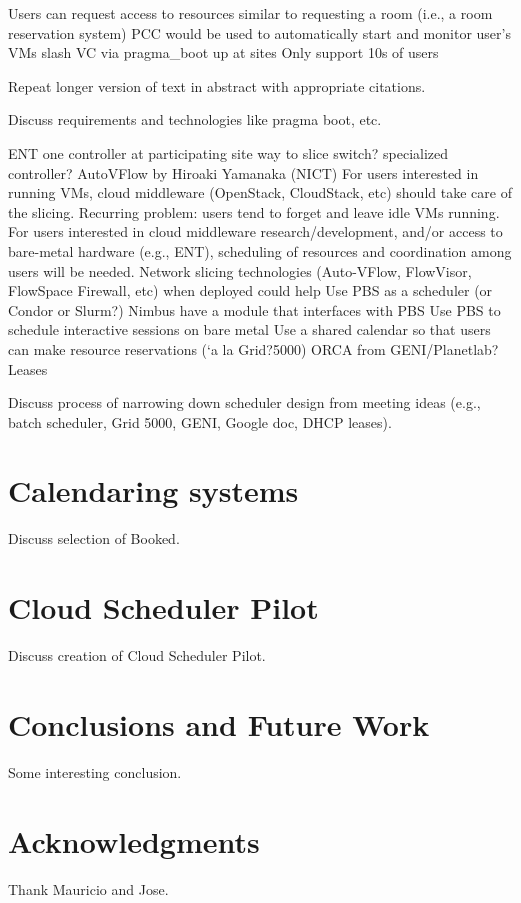 \documentclass{acm_proc_article-sp}
\begin{document}
Users can request access to resources similar to requesting a room (i.e., a room reservation system)
PCC would be used to automatically start and monitor user's VMs slash VC via pragma\_boot up at sites 
Only support 10s of users


Repeat longer version of text in abstract with appropriate citations.

Discuss requirements and technologies like pragma boot, etc.


ENT
one controller at participating site
way to slice switch? specialized controller? 
AutoVFlow by Hiroaki Yamanaka (NICT)
For users interested in running VMs, cloud middleware (OpenStack, CloudStack, etc) should take care of the slicing.
 Recurring problem: users tend to forget and leave idle VMs running.
For users interested in cloud middleware research/development, and/or access to bare-metal hardware (e.g., ENT), scheduling of resources and coordination among users will be needed.
Network slicing technologies (Auto-VFlow, FlowVisor, FlowSpace Firewall, etc) when deployed could help
Use PBS as a scheduler (or Condor or Slurm?)
Nimbus have a module that interfaces with PBS
 Use PBS to schedule interactive sessions on bare metal
Use a shared calendar so that users can make resource reservations (`a la Grid?5000)
ORCA from GENI/Planetlab? 
Leases


Discuss process of narrowing down scheduler design from meeting ideas 
(e.g., batch scheduler, Grid 5000, GENI, Google doc, DHCP leases).

\section{Calendaring systems}
\label{Sec:Calendars}

Discuss selection of Booked.

\section{Cloud Scheduler Pilot}
\label{Sec:Pilot}

Discuss creation of Cloud Scheduler Pilot.

\section{Conclusions and Future Work}
\label{Sec:Conclusions}

Some interesting conclusion.

\section{Acknowledgments}

Thank Mauricio and Jose.


  
\end{document}
